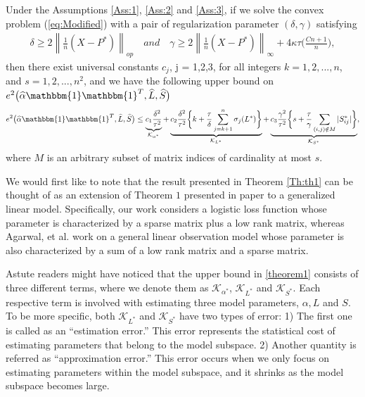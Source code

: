 \documentclass[AMS,STIX1COL]{WileyNJD-v2}
\begin{document}
{\begin{theorem} \label{Th:th1}
Under the Assumptions \ref{Ass:1}, \ref{Ass:2} and \ref{Ass:3},
if we solve the convex problem (\ref{eq:Modified}) with a pair of regularization parameter $(\delta,\gamma)$ satisfying
\begin{align} \label{eq:49}
\delta \geq 2 \left\|\frac{1}{n}(X-P^{*}) \right\|_{op} \quad and \quad \gamma \geq 2\left\|\frac{1}{n}(X-P^{*})\right\|_{\infty}+4\kappa\tau\bigg(\frac{Cn+1}{n} \bigg),
\end{align}
then there exist universal constants $c_{j}$, j = 1,2,3,  for all integers $k = 1,2,...,n$, and $s = 1,2,...,n^{2}$, and we have the following upper bound on $e^{2}\big(\widehat{\alpha}\mathbbm{1}\mathbbm{1}^T,\widehat{L},\widehat{S}\big)$
\begin{align} \label{theorem1}
    e^{2}\big(\widehat{\alpha}\mathbbm{1}\mathbbm{1}^T,\widehat{L},\widehat{S}\big) \leq
    \underbrace{c_{1}\frac{\delta^{2}}{\tau^{2}}}
    _{\mathcal{K}_{\alpha^*}} +
    \underbrace{c_{2}\frac{\delta^{2}}{\tau^{2}}
    \bigg\{k + \frac{\tau}{\delta}\sum_{j=k+1}^{n}\sigma_{j}(L^{*})\bigg\}}_{\mathcal{K}_{L^*}} +
    \underbrace{c_{3}\frac{\gamma^{2}}{\tau^{2}}
    \bigg\{s + \frac{\tau}{\gamma}\sum_{(i,j) \notin M}|S^*_{ij}|\bigg\}}_{\mathcal{K}_{S^*}},
\end{align}
where $M$ is an arbitrary subset of matrix indices of cardinality at most $s$.
\end{theorem}

We would first like to note that the result presented in Theorem \ref{Th:th1} can be thought of as an extension of Theorem $1$ presented in paper \cite{agarwal2012noisy} to a generalized linear model.
Specifically, our work considers a logistic loss function whose parameter is characterized by a sparse matrix plus a low rank matrix,
whereas Agarwal, et al. \cite{agarwal2012noisy} work on a general linear observation model whose parameter is also
characterized by a sum of a low rank matrix and a sparse matrix.


Astute readers might have noticed that the upper bound in \eqref{theorem1} consists of three different terms, where we denote them as
$\mathcal{K}_{\alpha^*}$, $\mathcal{K}_{L^*}$ and $\mathcal{K}_{S^*}$.
Each respective term is involved with estimating three model parameters, $\alpha, L$ and $S$.
To be more specific, both $\mathcal{K}_{L^*}$ and $\mathcal{K}_{S^*}$ have two types of error:
1) The first one is called as an ``estimation error.''
This error represents the statistical cost of estimating parameters that belong to the model subspace.
2) Another quantity is referred as ``approximation error.''
This error occurs when we only focus on estimating parameters within the model subspace,
and it shrinks as the model subspace becomes large.

}
\end{document}
